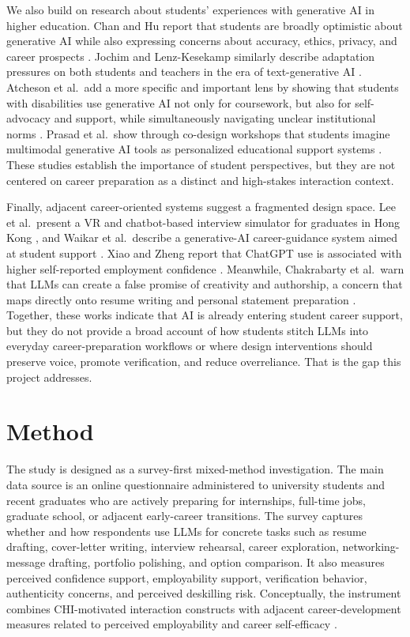 \documentclass[sigconf]{acmart}
\begin{document}
We also build on research about students' experiences with generative AI in higher education. Chan and Hu report that students are broadly optimistic about generative AI while also expressing concerns about accuracy, ethics, privacy, and career prospects \cite{chan2023studentsvoices}. Jochim and Lenz-Kesekamp similarly describe adaptation pressures on both students and teachers in the era of text-generative AI \cite{jochim2024teachingtesting}. Atcheson et al.\ add a more specific and important lens by showing that students with disabilities use generative AI not only for coursework, but also for self-advocacy and support, while simultaneously navigating unclear institutional norms \cite{atcheson2025disabilitygenai}. Prasad et al.\ show through co-design workshops that students imagine multimodal generative AI tools as personalized educational support systems \cite{prasad2025multimodal}. These studies establish the importance of student perspectives, but they are not centered on career preparation as a distinct and high-stakes interaction context.

Finally, adjacent career-oriented systems suggest a fragmented design space. Lee et al.\ present a VR and chatbot-based interview simulator for graduates in Hong Kong \cite{lee2024vrinterview}, and Waikar et al.\ describe a generative-AI career-guidance system aimed at student support \cite{waikar2024careerguidance}. Xiao and Zheng report that ChatGPT use is associated with higher self-reported employment confidence \cite{xiao2025employmentconfidence}. Meanwhile, Chakrabarty et al.\ warn that LLMs can create a false promise of creativity and authorship, a concern that maps directly onto resume writing and personal statement preparation \cite{chakrabarty2024artorartifice}. Together, these works indicate that AI is already entering student career support, but they do not provide a broad account of how students stitch LLMs into everyday career-preparation workflows or where design interventions should preserve voice, promote verification, and reduce overreliance. That is the gap this project addresses.

\section{Method}
The study is designed as a survey-first mixed-method investigation. The main data source is an online questionnaire administered to university students and recent graduates who are actively preparing for internships, full-time jobs, graduate school, or adjacent early-career transitions. The survey captures whether and how respondents use LLMs for concrete tasks such as resume drafting, cover-letter writing, interview rehearsal, career exploration, networking-message drafting, portfolio polishing, and option comparison. It also measures perceived confidence support, employability support, verification behavior, authenticity concerns, and perceived deskilling risk. Conceptually, the instrument combines CHI-motivated interaction constructs with adjacent career-development measures related to perceived employability and career self-efficacy \cite{bennett2022employability,jin2009careerdecision}.
\end{document}
